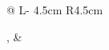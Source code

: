 


\begin{cventries}


\vspace{-3.0mm}
\setlength\tabcolsep{0pt}
\setlength{\extrarowheight}{0pt}
\begin{tabular*}{\textwidth}{@{\extracolsep{\fill}} L{\textwidth - 4.5cm} R{4.5cm}}

,  &  \\




\end{tabular*}
\end{cventries}
